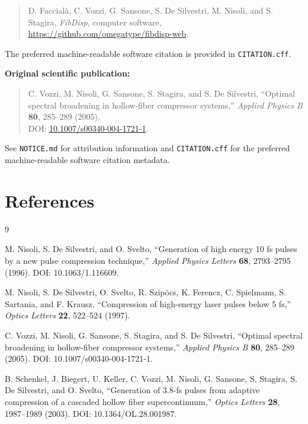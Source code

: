 \documentclass[11pt,a4paper]{article}
\begin{document}
\begin{quote}
D. Faccial\`a, C. Vozzi, G. Sansone, S. De Silvestri, M. Nisoli, and S. Stagira,
\textit{FibDisp}, computer software,\\
\href{https://github.com/omegatype/fibdisp-web}{https://github.com/omegatype/fibdisp-web}.
\end{quote}

The preferred machine-readable software citation is provided in
\texttt{CITATION.cff}.

\textbf{Original scientific publication:}

\begin{quote}
C. Vozzi, M. Nisoli, G. Sansone, S. Stagira, and S. De Silvestri,
``Optimal spectral broadening in hollow-fiber compressor systems,''
\textit{Applied Physics B} \textbf{80}, 285--289 (2005).\\
DOI: \href{https://doi.org/10.1007/s00340-004-1721-1}{10.1007/s00340-004-1721-1}.
\end{quote}

See \texttt{NOTICE.md} for attribution information and
\texttt{CITATION.cff} for the preferred machine-readable software citation
metadata.

\section{References}

\begin{thebibliography}{9}

M. Nisoli, S. De Silvestri, and O. Svelto,
``Generation of high energy 10 fs pulses by a new pulse compression
technique,''
\textit{Applied Physics Letters} \textbf{68}, 2793--2795 (1996).
DOI: 10.1063/1.116609.

M. Nisoli, S. De Silvestri, O. Svelto, R. Szip\"ocs, K. Ferencz,
C. Spielmann, S. Sartania, and F. Krausz,
``Compression of high-energy laser pulses below 5 fs,''
\textit{Optics Letters} \textbf{22}, 522--524 (1997).

C. Vozzi, M. Nisoli, G. Sansone, S. Stagira, and S. De Silvestri,
``Optimal spectral broadening in hollow-fiber compressor systems,''
\textit{Applied Physics B} \textbf{80}, 285--289 (2005).
DOI: 10.1007/s00340-004-1721-1.

B. Schenkel, J. Biegert, U. Keller, C. Vozzi, M. Nisoli, G. Sansone,
S. Stagira, S. De Silvestri, and O. Svelto,
``Generation of 3.8-fs pulses from adaptive compression of a cascaded
hollow fiber supercontinuum,''
\textit{Optics Letters} \textbf{28}, 1987--1989 (2003).
DOI: 10.1364/OL.28.001987.

\end{thebibliography}
\end{document}
